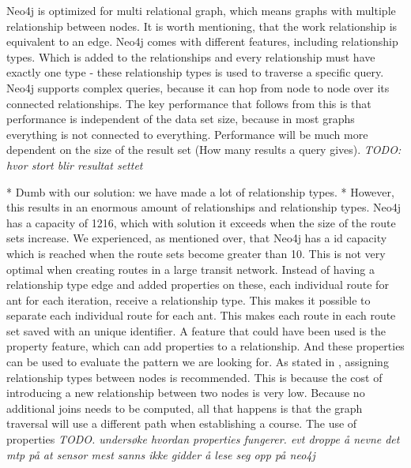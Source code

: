 Neo4j is optimized for multi relational graph, which means graphs with multiple relationship between nodes. It is worth mentioning, that the work relationship is equivalent to an edge. Neo4j comes with different features, including relationship types. Which is added to the relationships and every relationship must have exactly one type - these relationship types is used to traverse a specific query. Neo4j supports complex queries, because it can hop from node to node over its connected relationships. The key performance that follows from this is that performance is independent of the data set size, because in most graphs everything is not connected to everything. Performance will be much more dependent on the size of the result set (How many results a query gives).  \emph{\color{blue} TODO: hvor stort blir resultat settet }

* Dumb with our solution: we have made a lot of relationship types.
* However, this results in an enormous amount of relationships and relationship types. Neo4j has a capacity of 1216, which with solution it exceeds when the size of the route sets increase. We experienced, as mentioned over, that Neo4j has a id capacity which is reached when the route sets become greater than 10. This is not very optimal when creating routes in a large transit network. Instead of having a relationship type edge and added properties on these, each individual route for ant for each iteration, receive a relationship type. This makes it possible to separate each individual route for each ant. This makes each route in each route set saved with an unique identifier. A feature that could have been used is the property feature, which can add properties to a relationship. And these properties can be used to evaluate the pattern we are looking for. As stated in \citet{bruggen14}, assigning relationship types between nodes is recommended. This is because the cost of introducing a new relationship between two nodes is very low. Because no additional joins needs to be computed, all that happens is that the graph traversal will use a different path when establishing a course. The use of properties \emph{\color{blue} TODO. undersøke hvordan properties fungerer. evt droppe å nevne det mtp på at sensor mest sanns ikke gidder å lese seg opp på neo4j}


